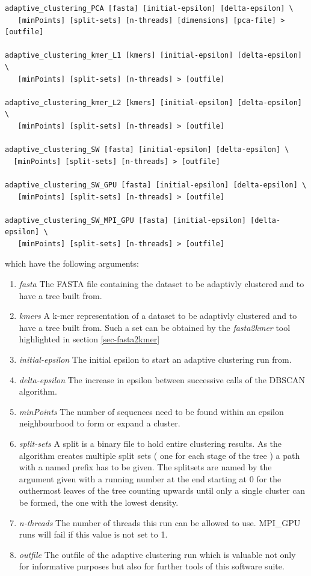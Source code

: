 \begin{lstlisting}
adaptive_clustering_PCA [fasta] [initial-epsilon] [delta-epsilon] \
   [minPoints] [split-sets] [n-threads] [dimensions] [pca-file] > [outfile]

adaptive_clustering_kmer_L1 [kmers] [initial-epsilon] [delta-epsilon] \
   [minPoints] [split-sets] [n-threads] > [outfile]

adaptive_clustering_kmer_L2 [kmers] [initial-epsilon] [delta-epsilon] \
   [minPoints] [split-sets] [n-threads] > [outfile]

adaptive_clustering_SW [fasta] [initial-epsilon] [delta-epsilon] \
  [minPoints] [split-sets] [n-threads] > [outfile]

adaptive_clustering_SW_GPU [fasta] [initial-epsilon] [delta-epsilon] \
   [minPoints] [split-sets] [n-threads] > [outfile]

adaptive_clustering_SW_MPI_GPU [fasta] [initial-epsilon] [delta-epsilon] \
   [minPoints] [split-sets] [n-threads] > [outfile]
\end{lstlisting}
which have the following arguments:
\begin{enumerate}
  \item \emph{fasta} The FASTA file containing the dataset to be
    adaptivly clustered and to have a tree built from.
  \item \emph{kmers} A k-mer representation of a dataset to be
    adaptivly clustered and to have a tree built from. Such a set can
    be obtained by the \emph{fasta2kmer} tool highlighted in section
    \ref{sec-fasta2kmer}
  \item \emph{initial-epsilon} The initial epsilon to start an adaptive
    clustering run from.
  \item \emph{delta-epsilon} The increase in epsilon between
    successive calls of the DBSCAN algorithm.
  \item \emph{minPoints} The number of sequences need to be found
    within an epsilon neighbourhood to form or expand a cluster.
  \item \emph{split-sets} A split is a binary file to hold entire clustering
    results. As the algorithm creates multiple split sets ( one for
    each stage of the tree ) a path with a named prefix has to be
    given. The splitsets are named by the argument given with a
    running number at the end starting at 0 for the outhermost leaves
    of the tree counting upwards until only a single cluster can be
    formed, the one with the lowest density.
  \item \emph{n-threads} The number of threads this run can be allowed
    to use. MPI\_GPU runs will fail if this value is not set to 1.
  \item \emph{outfile} The outfile of the adaptive clustering run
    which is valuable not only for informative purposes but also for
    further tools of this software suite.
\end{enumerate}

